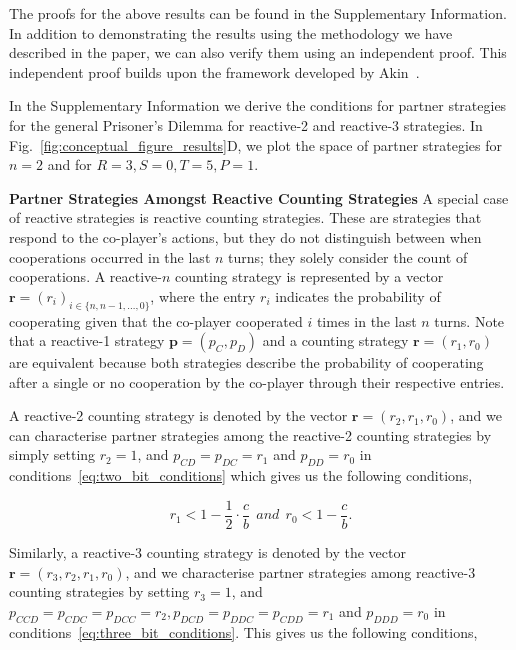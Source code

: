 \documentclass{article}
\theoremstyle{definition}
\begin{document}
The proofs for the above results can be found in the Supplementary Information.
In addition to demonstrating the results using the methodology we have described
in the paper, we can also verify them using an independent proof. This
independent proof builds upon the framework developed by
Akin~\cite{akin:EGADS:2016}.

In the Supplementary Information we derive the conditions for partner strategies
for the general Prisoner's Dilemma for reactive-2 and reactive-3 strategies. In
Fig.~\ref{fig:conceptual_figure_results}D, we plot the space of partner
strategies for $n=2$ and for $R =3, S=0, T=5, P=1$.

\textbf{Partner Strategies Amongst Reactive Counting Strategies}
A special case of reactive strategies is reactive counting strategies. These are
strategies that respond to the co-player's actions, but they do not distinguish
between when cooperations occurred in the last $n$ turns; they solely consider
the count of cooperations. A reactive-$n$ counting strategy is represented by a
vector $\mathbf{r}=(r_i)_{i \in \{n, n -1, \dots, 0\}}$, where the entry \(r_i\)
indicates the probability of cooperating given that the co-player cooperated
\(i\) times in the last \(n\) turns. Note that a reactive-1 strategy
$\mathbf{p}=(p_{C}, p_{D})$ and a counting strategy $\mathbf{r}=(r_1, r_0)$ are
equivalent because both strategies describe the probability of cooperating after
a single or no cooperation by the co-player through their respective entries. 

A reactive-2 counting strategy is denoted by the vector $\mathbf{r}=(r_2,
r_1, r_0)$, and we can characterise partner strategies among the reactive-2
counting strategies by simply setting $r_2 = 1$, and $p_{CD} = p_{DC} = r_1$ and
$p_{DD} = r_0$ in conditions~\eqref{eq:two_bit_conditions} which gives us the
following conditions,

\begin{equation}\label{eq:counting_two_bit_conditions}
  \displaystyle r_1 < 1-\frac{1}{2} \cdot \frac{c}{b} ~~and~~ r_0 < 1\!-\! \frac{c}{b}.
\end{equation}

Similarly, a reactive-3 counting strategy is denoted by the vector
$\mathbf{r}=(r_3, r_2, r_1, r_0)$, and we characterise partner strategies among
reactive-3 counting strategies by setting $r_3 = 1$, and $p_{CCD} = p_{CDC} =
p_{DCC} = r_2, p_{DCD} = p_{DDC} = p_{CDD} = r_1$ and $p_{DDD} = r_0$ in
conditions~\eqref{eq:three_bit_conditions}. This gives us the following
conditions,
\end{document}
